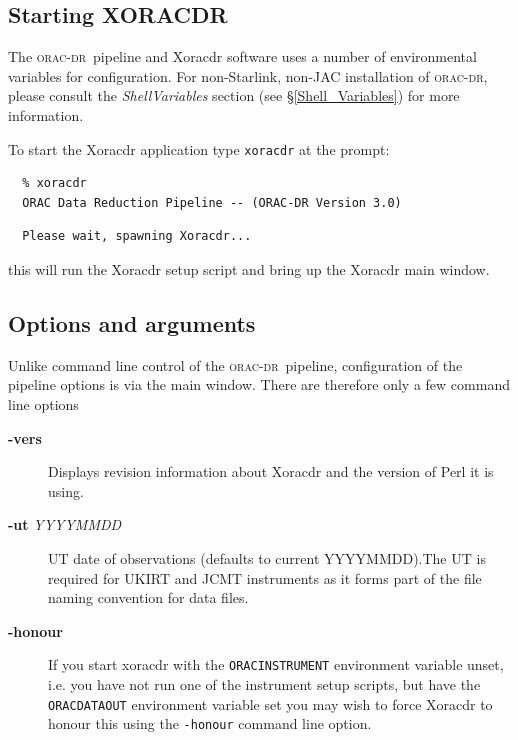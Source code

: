 \documentclass[twoside,11pt]{article}
\renewcommand{\_}{\texttt{\symbol{95}}}
\newcommand{\oracdr}{\textsc{orac-dr}}
\begin{document}
\subsection*{Starting XORACDR\label{Xoracdr_STARTING_XORACDR}}

The \oracdr\ pipeline and Xoracdr software uses a number of
environmental variables for configuration. For non-Starlink, non-JAC
installation of \oracdr, please consult the \emph{ShellVariables} section (see
\S\ref{Shell_Variables}) for more information.



To start the Xoracdr application type \texttt{xoracdr} at the prompt:

\begin{verbatim}
  % xoracdr
  ORAC Data Reduction Pipeline -- (ORAC-DR Version 3.0)
\end{verbatim}
\begin{verbatim}
  Please wait, spawning Xoracdr...
\end{verbatim}


this will run the Xoracdr setup script and bring up the Xoracdr main window.

\subsection*{Options and arguments\label{Xoracdr_OPTIONS_AND_ARGUMENTS}}

Unlike command line control of the \oracdr\ pipeline, configuration of
the pipeline options is via the main window. There are therefore only
a few command line options

\begin{description}
\item[\textbf{-vers}] \mbox{}

Displays revision information about Xoracdr and the version of Perl it
is using.

\item[\textbf{-ut} \textit{YYYYMMDD}] \mbox{}

UT date of observations (defaults to current YYYYMMDD).The UT is
required for UKIRT and JCMT instruments as it forms part of the file
naming convention for data files.

\item[\textbf{-honour}] \mbox{}

If you start xoracdr with the \texttt{ORAC\_INSTRUMENT} environment variable
unset, i.e. you have not run one of the instrument setup scripts, but
have the \texttt{ORAC\_DATA\_OUT} environment variable set you may wish to
force Xoracdr to honour this using the \texttt{-honour} command line option.

\end{description}
\end{document}
